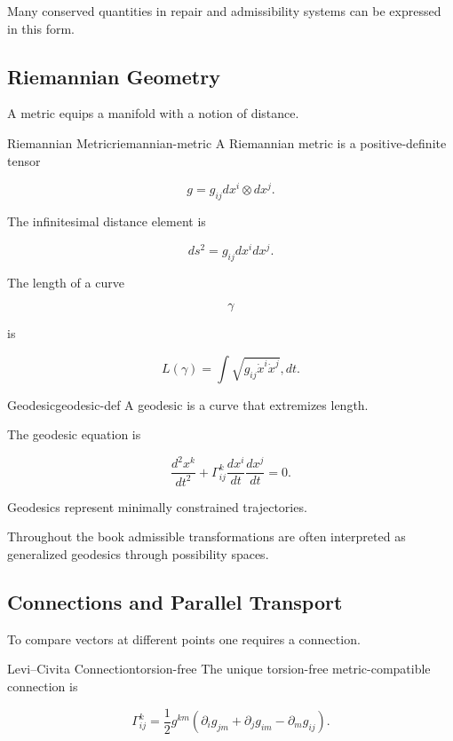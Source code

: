 \documentclass[12pt,twoside,openright]{book}
\begin{document}
Many conserved quantities in repair and admissibility
systems can be expressed in this form.

\subsection{Riemannian Geometry}

A metric equips a manifold with a notion of distance.

\begin{definition}{Riemannian Metric}{riemannian-metric}
A Riemannian metric is a positive-definite tensor

\[
g
=

g_{ij}
dx^i\otimes dx^j.
\]
\end{definition}

The infinitesimal distance element is

\[
ds^2
=

g_{ij}
dx^i dx^j.
\]

The length of a curve

\[
\gamma
\]

is

\[
L(\gamma)
=

\int
\sqrt{
g_{ij}
\dot x^i
\dot x^j
}
,dt.
\]

\begin{definition}{Geodesic}{geodesic-def}
A geodesic is a curve that extremizes length.
\end{definition}

The geodesic equation is

\[
\frac{d^2x^k}{dt^2}
+
\Gamma^k_{ij}
\frac{dx^i}{dt}
\frac{dx^j}{dt}
=
0.

\]

Geodesics represent minimally constrained trajectories.

Throughout the book admissible transformations are often
interpreted as generalized geodesics through possibility
spaces.

\subsection{Connections and Parallel Transport}

To compare vectors at different points one requires a
connection.

\begin{definition}{Levi--Civita Connection}{torsion-free}
The unique torsion-free metric-compatible connection is

\[
\Gamma^k_{ij}
=
\frac12
g^{km}
\left(
\partial_i g_{jm}
+
\partial_j g_{im}
-
\partial_m g_{ij}
\right).
\]
\end{definition}
\end{document}
